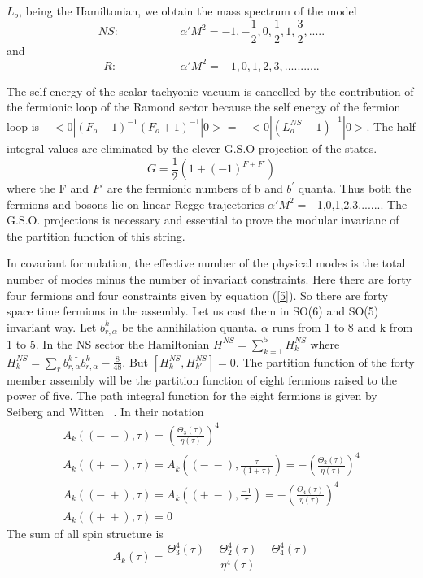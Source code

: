 \documentclass[a4paper,showpacs,preprintnumbers,amsmath,amssymb]{revtex4}
\begin{document}
$L_o$, being the Hamiltonian, we obtain the mass spectrum of the model
\begin{equation}
NS:~~~~~~~~~~~~~~~~~~~~~~~~\alpha'M^2=-1,-\frac{1}{2},0,\frac{1}{2},1,\frac{3}{2},.....
\end{equation}
and 
\begin{equation}
R:~~~~~~~~~~~~~~~~~~~~~~~~~\alpha'M^2=-1,0,1,2,3,...........
\end{equation}

The self energy of the scalar tachyonic vacuum is cancelled by the contribution 
of the fermionic loop of the Ramond sector because the self energy of the fermion 
loop is $-<0|(F_o-1)^{-1}(F_o+1)^{-1}|0>= -<0|(L_o^{NS}-1)^{-1}|0>$.
 The half integral values are 
eliminated by the clever G.S.O projection of the states.
\begin{equation}
G=\frac{1}{2}(1+(-1)^{F+F'})
\end{equation}
where the F and $F'$ are the fermionic numbers of b and $b^{\prime}$ quanta. Thus both 
the fermions and bosons lie on linear Regge trajectories $\alpha'M^2=$ -1,0,1,2,3........ 
The G.S.O. projections is necessary and essential to prove the modular
invarianc of the partition function of this string. 

In covariant formulation, 
the effective number of the physical modes is the total number of modes minus the
number of invariant constraints. Here there are forty four fermions and four
 constraints given by equation (\ref{5}). So there are forty space time fermions in
the assembly. Let us cast them in SO(6) and SO(5) invariant way.
Let $b^k_{r,\alpha}$ be the annihilation quanta. $\alpha$ runs from 1 to 8 and 
k from 1 to 5. In the NS sector the Hamiltonian $H^{NS}=\sum_{k=1}^5H_k^{NS}$ where
$H^{NS}_k=\sum_r b^{k\dagger}_{r,\alpha}b^{k}_{r,\alpha}-\frac{8}{48}$. But
$[ H_k^{NS}, H_{k'}^{NS}]=0$. The partition function of the forty member 
assembly will be the partition function of eight fermions  raised to the power of 
five.
The path integral function for the eight fermions is given by Seiberg and Witten
~\cite{se}. In their notation 
\begin{eqnarray}
A_k ((-~-),\tau)= (\frac{\Theta_3 (\tau)}{\eta(\tau)})^4\\
A_k((+~-),\tau) = A_k((-~-),\frac{\tau }{(1+\tau)})=- 
(\frac{\Theta_2(\tau)} {\eta(\tau)})^4\\
A_k((-~+),\tau)=A_k((+~-),\frac{-1}{\tau})=- 
(\frac{\Theta_4(\tau)}{\eta(\tau)})^4\\
A_k((+~+),\tau)=0
\end{eqnarray}
 The sum of all spin structure is 
\begin{equation}
A_k(\tau) =\frac{\Theta^4_3(\tau)- \Theta^4_2(\tau)-\Theta^4_4(\tau)}
{\eta^4(\tau)}
\end{equation}
\end{document}
